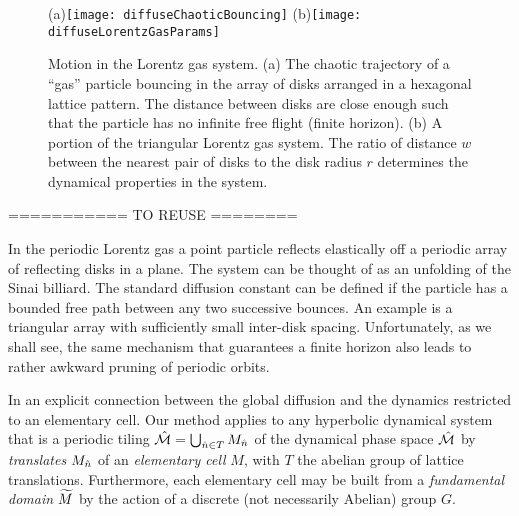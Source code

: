 

\begin{figure}[htbp]
  \begin{center}
    (a)\texttt{[image: diffuseChaoticBouncing]}
    (b)\texttt{[image: diffuseLorentzGasParams]}
  \end{center}
  \caption[]{\label{fig-chaoticBouncing}
  Motion in the Lorentz gas system. (a)  The chaotic trajectory of a
  ``gas'' particle bouncing in the array of disks  arranged in a
  hexagonal lattice pattern. The distance between disks are close  enough
  such that the particle has no infinite free flight (finite horizon).
  (b) A portion of the triangular Lorentz gas    system. The ratio of
  distance $w$ between the nearest pair of disks to the    disk radius
  $r$ determines the dynamical properties in the system.
  }
\end{figure}


\bigskip
=========== TO REUSE ========

In the periodic Lorentz gas
a point particle reflects elastically off
a periodic array of reflecting disks in a plane.
The system can
be thought of as an unfolding of the Sinai billiard.
The standard diffusion constant can be defined if the particle has a bounded
free path between any two successive bounces.
An example is a triangular array with sufficiently small
inter-disk spacing.
Unfortunately, as we shall see,
the same mechanism that guarantees a finite horizon
also leads to rather awkward pruning of periodic orbits.

In   an explicit
connection between the global diffusion and the dynamics restricted to
an elementary cell.
Our method applies to any  hyperbolic dynamical system that is
a periodic tiling $\hat {{\cal M}}=\bigcup_{ \hat n \in T} M_{
\hat n}$
of the dynamical phase space $\hat {{\cal M}}$ by {\sl translates}
$M_{\hat n}$
of an {\sl elementary cell} $M$, with $T$ the abelian group of lattice
translations.
Furthermore, each elementary cell may be built from a
{\sl fundamental domain}
${\widetilde M}$
by the action of a discrete (not necessarily Abelian) group $G$.

